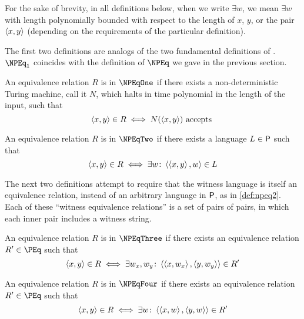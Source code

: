 For the sake of brevity, in all definitions below, when we write $\exists w$, we mean $\exists w$ with length polynomially bounded with respect to the length of $x$, $y$, or the pair $\pair{x}{y}$ (depending on the requirements of the particular definition).

The first two definitions are analogs of the two fundamental definitions of \NP.
$\NPEq_1$ coincides with the definition of $\NPEq$ we gave in the previous section.
\begin{definition}\label{def:npeq1}
  An equivalence relation $R$ is in $\NPEqOne$ if there exists a non-deterministic Turing machine, call it $N$, which halts in time polynomial in the length of the input, such that
  \begin{displaymath}
    \pair{x}{y}\in R\iff N(\pair{x}{y})\plain{accepts}
  \end{displaymath}
\end{definition}
\begin{definition}\label{def:npeq2}
  An equivalence relation $R$ is in $\NPEqTwo$ if there exists a language $L\in\P$ such that
  \begin{displaymath}
    \pair{x}{y}\in R\iff \exists w\colon \pair{\pair{x}{y}}{w}\in L
  \end{displaymath}
\end{definition}

The next two definitions attempt to require that the witness language is itself an equivalence relation, instead of an arbitrary language in $\P$, as in \autoref{def:npeq2}.
Each of these ``witness equivalence relations'' is a set of pairs of pairs, in which each inner pair includes a witness string.
\begin{definition}\label{def:npeq3}
  An equivalence relation $R$ is in $\NPEqThree$ if there exists an equivalence relation $R'\in \PEq$ such that
  \begin{displaymath}
    \pair{x}{y}\in R\iff \exists w_x,w_y\colon \pair{\pair{x}{w_x}}{\pair{y}{w_y}}\in R'
  \end{displaymath}
\end{definition}
\begin{definition}\label{def:npeq4}
  An equivalence relation $R$ is in $\NPEqFour$ if there exists an equivalence relation $R'\in \PEq$ such that
  \begin{displaymath}
    \pair{x}{y}\in R\iff \exists w\colon \pair{\pair{x}{w}}{\pair{y}{w}}\in R'
  \end{displaymath}
\end{definition}

